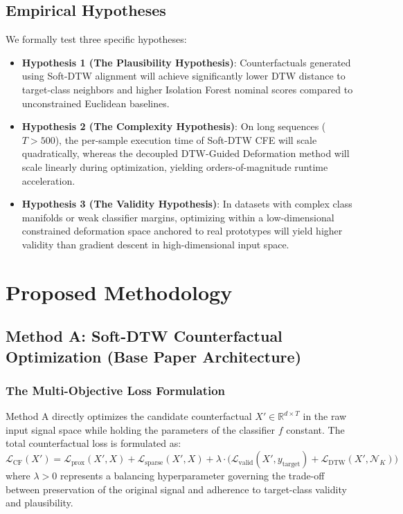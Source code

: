\documentclass[11pt,a4paper]{report}
\begin{document}
\section{Empirical Hypotheses}
We formally test three specific hypotheses:
\begin{itemize}
    \item \textbf{Hypothesis 1 (The Plausibility Hypothesis)}: Counterfactuals generated using Soft-DTW alignment will achieve significantly lower DTW distance to target-class neighbors and higher Isolation Forest nominal scores compared to unconstrained Euclidean baselines.
    \item \textbf{Hypothesis 2 (The Complexity Hypothesis)}: On long sequences ($T > 500$), the per-sample execution time of Soft-DTW CFE will scale quadratically, whereas the decoupled DTW-Guided Deformation method will scale linearly during optimization, yielding orders-of-magnitude runtime acceleration.
    \item \textbf{Hypothesis 3 (The Validity Hypothesis)}: In datasets with complex class manifolds or weak classifier margins, optimizing within a low-dimensional constrained deformation space anchored to real prototypes will yield higher validity than gradient descent in high-dimensional input space.
\end{itemize}

\chapter{Proposed Methodology}

\section{Method A: Soft-DTW Counterfactual Optimization (Base Paper Architecture)}

\subsection{The Multi-Objective Loss Formulation}
Method A directly optimizes the candidate counterfactual $X' \in \mathbb{R}^{d \times T}$ in the raw input signal space while holding the parameters of the classifier $f$ constant. The total counterfactual loss is formulated as:
\begin{equation}
    \mathcal{L}_{\text{CF}}(X') = \mathcal{L}_{\text{prox}}(X', X) + \mathcal{L}_{\text{sparse}}(X', X) + \lambda \cdot \Big(\mathcal{L}_{\text{valid}}(X', y_{\text{target}}) + \mathcal{L}_{\text{DTW}}(X', \mathcal{N}_K)\Big)
\end{equation}
where $\lambda > 0$ represents a balancing hyperparameter governing the trade-off between preservation of the original signal and adherence to target-class validity and plausibility.
\end{document}
